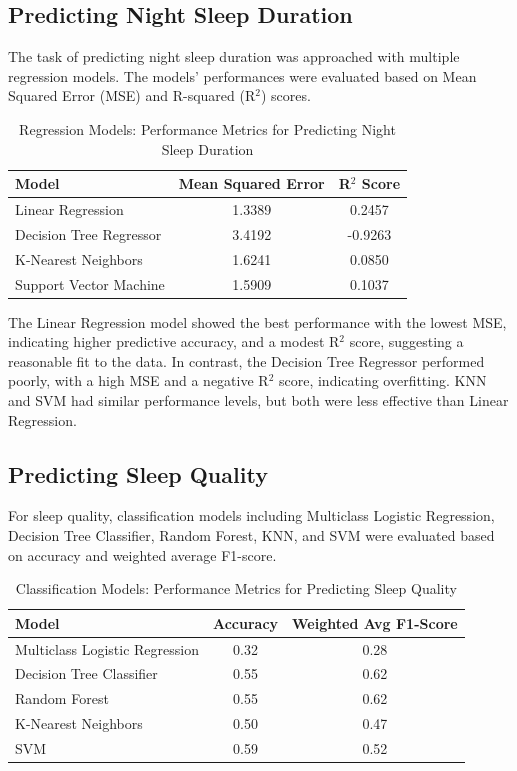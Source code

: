 \documentclass[conference]{IEEEtran}
\begin{document}
\subsection{Predicting Night Sleep Duration}
The task of predicting night sleep duration was approached with multiple regression models. The models' performances were evaluated based on Mean Squared Error (MSE) and R-squared (R\(^2\)) scores. 

\begin{table}[ht]
\centering
\caption{Regression Models: Performance Metrics for Predicting Night Sleep Duration}
\label{tab:regression-models}
\begin{tabular}{|l|c|c|}
\hline
\textbf{Model} & \textbf{Mean Squared Error} & \textbf{R\(^2\) Score} \\
\hline
Linear Regression & 1.3389 & 0.2457 \\
Decision Tree Regressor & 3.4192 & -0.9263 \\
K-Nearest Neighbors & 1.6241 & 0.0850 \\
Support Vector Machine & 1.5909 & 0.1037 \\
\hline
\end{tabular}
\end{table}

The Linear Regression model showed the best performance with the lowest MSE, indicating higher predictive accuracy, and a modest R\(^2\) score, suggesting a reasonable fit to the data. In contrast, the Decision Tree Regressor performed poorly, with a high MSE and a negative R\(^2\) score, indicating overfitting. KNN and SVM had similar performance levels, but both were less effective than Linear Regression.

\subsection{Predicting Sleep Quality}
For sleep quality, classification models including Multiclass Logistic Regression, Decision Tree Classifier, Random Forest, KNN, and SVM were evaluated based on accuracy and weighted average F1-score.

\begin{table}[ht]
\centering
\caption{Classification Models: Performance Metrics for Predicting Sleep Quality}
\label{tab:classification-models}
\begin{tabular}{|l|c|c|}
\hline
\textbf{Model} & \textbf{Accuracy} & \textbf{Weighted Avg F1-Score} \\
\hline
Multiclass Logistic Regression & 0.32 & 0.28 \\
Decision Tree Classifier & 0.55 & 0.62 \\
Random Forest & 0.55 & 0.62 \\
K-Nearest Neighbors & 0.50 & 0.47 \\
SVM & 0.59 & 0.52 \\
\hline
\end{tabular}
\end{table}
\end{document}
